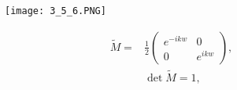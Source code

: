 \begin{figure}[ht]
    \begin{minipage}{0.5\textwidth}
        \centering
        \texttt{[image: 3\_5\_6.PNG]}
    \end{minipage}
    \begin{minipage}{0.5\textwidth}
        \begin{equation}
            \begin{aligned}
                \widetilde{M} = &\frac{1}{2}\left(\begin{array}{cc}{e^{-ikw}} & {0}\\{0}&{e^{ikw}}
                \end{array}\right),
                \\& \operatorname{det}\widetilde{M}=1,
            \end{aligned}
        \end{equation}
    \end{minipage}
\end{figure}


